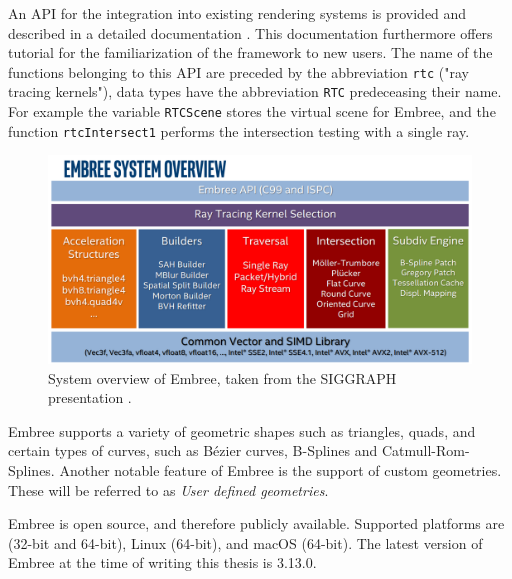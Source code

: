 An API for the integration into existing rendering systems is provided and described in a detailed documentation \cite{embree2021Doc}. This documentation furthermore offers tutorial for the familiarization of the framework to new users. The name of the functions belonging to this API are preceded by the abbreviation \texttt{rtc} ("ray tracing kernels"), data types have the abbreviation \texttt{RTC} predeceasing their name. For example the variable \texttt{RTCScene} stores the virtual scene for Embree, and the function \texttt{rtcIntersect1} performs the intersection testing with a single ray.

\begin{figure}
	\centering
	\includegraphics[width=1\linewidth]{img/1 fundamentals/embree_overview.png}
	\caption{System overview of Embree, taken from the SIGGRAPH presentation  \cite{embreeSlides}.}
	\label{fig:embree}
\end{figure}

Embree supports a variety of geometric shapes such as triangles, quads, and certain types of curves, such as Bézier curves, B-Splines and Catmull-Rom-Splines.
Another notable feature of Embree is the support of custom geometries. These will be referred to as \emph{User defined geometries}. 

Embree is open source, and therefore publicly available. Supported platforms are (32-bit and 64-bit), Linux (64-bit), and macOS (64-bit). The latest version of Embree at the time of writing this thesis is 3.13.0. 

